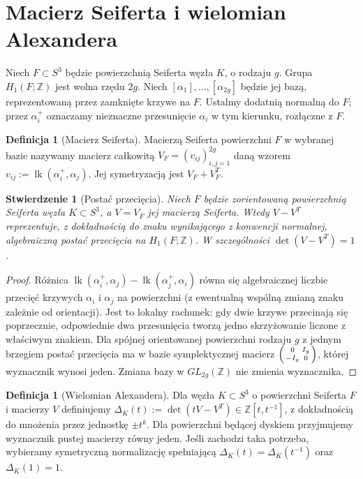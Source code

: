 \documentclass[11pt,a4paper]{report}
\numberwithin{equation}{section}
\theoremstyle{plain}
\newtheorem{stwierdzenie}[twierdzenie]{Stwierdzenie}
\theoremstyle{definition}
\newtheorem{definicja}[twierdzenie]{Definicja}
\theoremstyle{remark}
\begin{document}
\section{Macierz Seiferta i wielomian Alexandera}
\label{sec:kt-alexander}

Niech $F\subset S^3$ będzie powierzchnią Seiferta węzła $K$,
o rodzaju $g$. Grupa $H_1(F;\mathbb Z)$ jest wolna rzędu $2g$.
Niech $[\alpha_1],\dots,[\alpha_{2g}]$ będzie jej bazą,
reprezentowaną przez zamknięte krzywe na $F$. Ustalmy dodatnią
normalną do $F$; przez $\alpha_i^+$ oznaczamy nieznaczne
przesunięcie $\alpha_i$ w tym kierunku, rozłączne z $F$.

\begin{definicja}[Macierz Seiferta]
Macierzą Seiferta powierzchni $F$ w wybranej bazie nazywamy
macierz całkowitą $V_F=(v_{ij})_{i,j=1}^{2g}$ daną wzorem
$v_{ij}:=\operatorname{lk}(\alpha_i^+,\alpha_j)$.
Jej symetryzacją jest $V_F+V_F^T$.
\end{definicja}

\begin{stwierdzenie}[Postać przecięcia]
Niech $F$ będzie zorientowaną powierzchnią Seiferta węzła
$K\subset S^3$, a $V=V_F$ jej macierzą Seiferta. Wtedy
$V-V^T$ reprezentuje, z dokładnością do znaku wynikającego
z konwencji normalnej, algebraiczną postać przecięcia
na $H_1(F;\mathbb Z)$. W szczególności $\det(V-V^T)=1$.
\end{stwierdzenie}

\begin{proof}
Różnica $\operatorname{lk}(\alpha_i^+,\alpha_j)
-\operatorname{lk}(\alpha_j^+,\alpha_i)$ równa się algebraicznej
liczbie przecięć krzywych $\alpha_i$ i $\alpha_j$ na powierzchni
(z ewentualną wspólną zmianą znaku zależnie od orientacji).
Jest to lokalny rachunek: gdy dwie krzywe przecinają się
poprzecznie, odpowiednie dwa przesunięcia tworzą jedno
skrzyżowanie liczone z właściwym znakiem. Dla spójnej
orientowanej powierzchni rodzaju $g$ z jednym brzegiem
postać przecięcia ma w bazie symplektycznej macierz
$\begin{psmallmatrix}0&I_g\\-I_g&0\end{psmallmatrix}$,
której wyznacznik wynosi jeden. Zmiana bazy w $GL_{2g}(\mathbb Z)$
nie zmienia wyznacznika.
\end{proof}

\begin{definicja}[Wielomian Alexandera]
Dla węzła $K\subset S^3$ o powierzchni Seiferta $F$
i macierzy $V$ definiujemy
$\Delta_K(t):=\det(tV-V^T)\in\mathbb Z[t,t^{-1}]$,
z dokładnością do mnożenia przez jednostkę $\pm t^k$.
Dla powierzchni będącej dyskiem przyjmujemy wyznacznik pustej
macierzy równy jeden. Jeśli zachodzi taka potrzeba, wybieramy
symetryczną normalizację spełniającą
$\Delta_K(t)=\Delta_K(t^{-1})$ oraz $\Delta_K(1)=1$.
\end{definicja}
\end{document}
